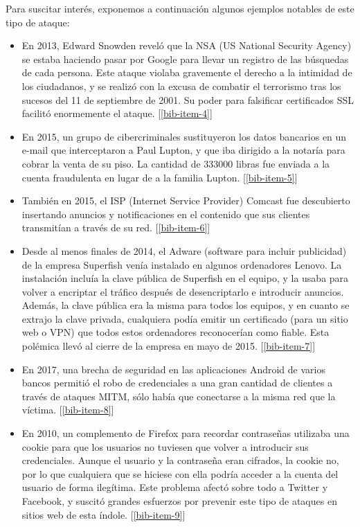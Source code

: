 \documentclass[11pt]{article}
\begin{document}
Para suscitar interés, exponemos a continuación algunos ejemplos notables de este tipo de ataque:
\begin{itemize}
	\item En 2013, Edward Snowden reveló que la NSA (US National Security Agency) se estaba haciendo pasar por Google para llevar un
	registro de las búsquedas de cada persona. Este ataque violaba gravemente el derecho a la intimidad de los ciudadanos, y se realizó con
	la excusa de combatir el terrorismo tras los sucesos del 11 de septiembre de 2001. Su poder para falsificar certificados SSL facilitó
	enormemente el ataque. [\ref{bib-item-4}]
	
	\item En 2015, un grupo de cibercriminales sustituyeron los datos bancarios en un e-mail que interceptaron a Paul Lupton, y que iba dirigido
	a la notaría para cobrar la venta de su piso. La cantidad de 333000 libras fue enviada a la cuenta fraudulenta en lugar de a la familia Lupton. [\ref{bib-item-5}]
	
	\item También en 2015, el ISP (Internet Service Provider) Comcast fue descubierto insertando anuncios y notificaciones en el contenido
	que sus clientes transmitían a través de su red. [\ref{bib-item-6}]
	
	\item Desde al menos finales de 2014, el Adware (software para incluir publicidad) de la empresa Superfish venía instalado en algunos ordenadores
	Lenovo. La instalación incluía la clave pública de Superfish en el equipo, y la usaba para volver a encriptar el tráfico después de desencriptarlo
	e introducir anuncios. Además, la clave pública era la misma para todos los equipos, y en cuanto se extrajo la clave privada, cualquiera podía
	emitir un certificado (para un sitio web o VPN) que todos estos ordenadores reconocerían como fiable. Esta polémica llevó al cierre de la empresa
	en mayo de 2015. [\ref{bib-item-7}]
	
	\item En 2017, una brecha de seguridad en las aplicaciones Android de varios bancos permitió el robo de credenciales a una gran cantidad de clientes
	a través de ataques MITM, sólo había que conectarse a la misma red que la víctima. [\ref{bib-item-8}]
	
	\item En 2010, un complemento de Firefox para recordar contraseñas utilizaba una cookie para que los usuarios no tuviesen que volver a introducir
	sus credenciales. Aunque el usuario y la contraseña eran cifrados, la cookie no, por lo que cualquiera que se hiciese con ella podría acceder
	a la cuenta del usuario de forma ilegítima. Este problema afectó sobre todo a Twitter y Facebook, y suscitó grandes esfuerzos por prevenir este tipo
	 de ataques en sitios web de esta índole. [\ref{bib-item-9}]
\end{itemize}
\end{document}
